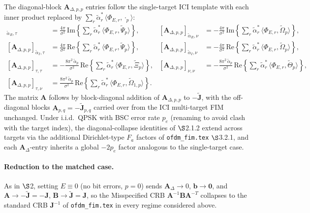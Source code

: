 \documentclass[11pt]{article}
\begin{document}
The diagonal-block \(\bm{A}_{\Delta, p, p}\) entries follow the single-target ICI template with each inner product replaced by \(\sum_r \tilde{\alpha}_r^*\, \langle \Phi_{E,r}, \cdot_p\rangle\):
\begin{align}
    [\bm{A}_{\Delta, p,p}]_{\tilde{\alpha}_R, \tau} &= \tfrac{4\pi}{\sigma^2}\, \mathrm{Im}\!\left\{ \sum_r \tilde{\alpha}_r^*\, \langle \Phi_{E,r}, \tilde{\Psi}_p\rangle \right\}, &
    [\bm{A}_{\Delta, p,p}]_{\tilde{\alpha}_R, \nu} &= -\tfrac{4\pi}{\sigma^2}\, \mathrm{Im}\!\left\{ \sum_r \tilde{\alpha}_r^*\, \langle \Phi_{E,r}, \tilde{\Omega}_p\rangle \right\}, \\
    [\bm{A}_{\Delta, p,p}]_{\tilde{\alpha}_I, \tau} &= \tfrac{4\pi}{\sigma^2}\, \mathrm{Re}\!\left\{ \sum_r \tilde{\alpha}_r^*\, \langle \Phi_{E,r}, \tilde{\Psi}_p\rangle \right\}, &
    [\bm{A}_{\Delta, p,p}]_{\tilde{\alpha}_I, \nu} &= -\tfrac{4\pi}{\sigma^2}\, \mathrm{Re}\!\left\{ \sum_r \tilde{\alpha}_r^*\, \langle \Phi_{E,r}, \tilde{\Omega}_p\rangle \right\}, \\
    [\bm{A}_{\Delta, p,p}]_{\tau, \tau} &= -\tfrac{8\pi^2\, \tilde{\alpha}_p}{\sigma^2}\, \mathrm{Re}\!\left\{ \sum_r \tilde{\alpha}_r^*\, \langle \Phi_{E,r}, \tilde{\Xi}_p\rangle \right\}, &
    [\bm{A}_{\Delta, p,p}]_{\nu, \nu} &= -\tfrac{8\pi^2\, \tilde{\alpha}_p}{\sigma^2}\, \mathrm{Re}\!\left\{ \sum_r \tilde{\alpha}_r^*\, \langle \Phi_{E,r}, \tilde{\Theta}_p\rangle \right\}, \\
    [\bm{A}_{\Delta, p,p}]_{\tau, \nu} &= \tfrac{8\pi^2\, \tilde{\alpha}_p}{\sigma^2}\, \mathrm{Re}\!\left\{ \sum_r \tilde{\alpha}_r^*\, \langle \Phi_{E,r}, \tilde{\Omega}_{1,p}\rangle \right\}. & &
\end{align}
The matrix \(\bm{A}\) follows by block-diagonal addition of \(\bm{A}_{\Delta, p,p}\) to \(-\tilde{\bm{J}}\), with the off-diagonal blocks \(\bm{A}_{p,q} = -\tilde{\bm{J}}_{p,q}\) carried over from the ICI multi-target FIM unchanged. Under i.i.d.\ QPSK with BSC error rate \(p_e\) (renaming to avoid clash with the target index), the diagonal-collapse identities of \(\S\)2.1.2 extend across targets via the additional Dirichlet-type \(F_a\) factors of \texttt{ofdm\_fim.tex} \(\S\)3.2.1, and each \(\bm{A}_\Delta\)-entry inherits a global \(-2p_e\) factor analogous to the single-target case.

\paragraph{Reduction to the matched case.} As in \(\S\)2, setting \(E \equiv 0\) (no bit errors, \(p = 0\)) sends \(\bm{A}_\Delta \to 0\), \(\bm{b} \to \bm{0}\), and \(\bm{A} \to -\tilde{\bm{J}} = -\bm{J}\), \(\bm{B} \to \tilde{\bm{J}} = \bm{J}\), so the Misspecified CRB \(\bm{A}^{-1}\bm{B}\bm{A}^{-T}\) collapses to the standard CRB \(\bm{J}^{-1}\) of \texttt{ofdm\_fim.tex} in every regime considered above.
\end{document}
